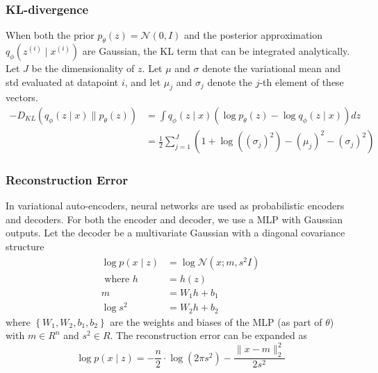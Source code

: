 \subsubsection*{KL-divergence}
When both the prior $p_{\theta}(z)=\mathcal{N} (0, I)$ and the posterior approximation $q_{\phi} \left(z^{(i)} \mid x^{(i)}\right)$ are Gaussian, the KL term that can be integrated analytically. Let $J$ be the dimensionality of $z$. Let $\mu$ and $\sigma$ denote the variational mean and std evaluated at datapoint $i$, and let $\mu_{j}$ and $\sigma_{j}$ denote the $j$-th element of these vectors.
\begin{equation*}
\begin{aligned}
-D_{KL}\left(q_{\phi}(z \mid x) \| p_{\theta}(z)\right)
&=\int q_{\phi}(z\mid x)\left(\log p_{\theta}(z)-\log q_{\phi}(z \mid x)\right) dz \\
&=\frac{1}{2} \sum_{j=1}^{J}\left(1+\log \left(\left(\sigma_{j}\right)^{2}\right)-\left(\mu_{j}\right)^{2}-\left(\sigma_{j}\right)^{2}\right)
\end{aligned}
\end{equation*}

\subsubsection*{Reconstruction Error}
In variational auto-encoders, neural networks are used as probabilistic encoders and decoders. For both the encoder and decoder, we use a MLP with Gaussian outputs. Let the decoder be a multivariate Gaussian with a diagonal covariance structure
\begin{equation*}
\begin{aligned}
\log p\left(x \mid z\right) &=\log \mathcal{N}\left(x; m, {s^{2}}I\right) \\
\text{ where } h &= h \left(z\right) \\
m &=W_{1}h+b_{1} \\
\log {s^{2}} &=W_{2}h+b_{2}
\end{aligned}
\end{equation*}
where $\left\{W_{1}, W_{2}, b_{1}, b_{2} \right\}$ are the weights and biases of the MLP (as part of $\theta$) with $m \in R^{n}$ and $s^{2} \in R$. The reconstruction error can be expanded as
\begin{equation*}
\log p\left(x \mid z\right) = -\frac{n}{2} \cdot \log \left(2\pi{s^{2}}\right) - \frac{\lVert x -  m \rVert_{2}^{2}} {2{s^{2}}}
\end{equation*}
